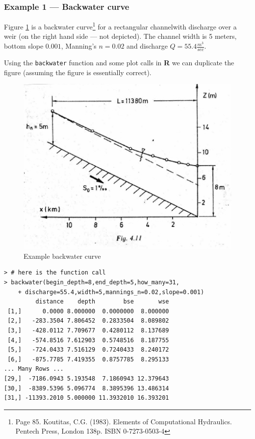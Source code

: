 \subsubsection{Example 1 --- Backwater curve}

Figure \ref{fig:example1} is a backwater curve\footnote{Page 85.  
   Koutitas, C.G. (1983). Elements of Computational Hydraulics. Pentech Press, London 138p. ISBN 0-7273-0503-4 } for a rectangular channelwith discharge over a weir (on the right hand side --- not depicted).  The channel width is 5 meters, bottom slope $0.001$, Manning's $n=0.02$ and discharge $Q=55.4 \frac{m^3}{sec}$.

Using the \texttt{backwater} function and some plot calls in \textbf{R} we can duplicate the figure (assuming the figure is essentially correct).

\begin{figure}[h!] %
   \centering
   \includegraphics[width=5in]{bw_curve1.jpg} 
   \caption{Example backwater curve} 
   \label{fig:example1}
\end{figure}
\newpage
\begin{lstlisting}[caption=R Console Output when script is run \\ , label=lst:backwaterConsole]
> # here is the function call
> backwater(begin_depth=8,end_depth=5,how_many=31,
    + discharge=55.4,width=5,mannings_n=0.02,slope=0.001)
         distance    depth        bse       wse
 [1,]      0.0000 8.000000  0.0000000  8.000000
 [2,]   -283.3504 7.806452  0.2833504  8.089802
 [3,]   -428.0112 7.709677  0.4280112  8.137689
 [4,]   -574.8516 7.612903  0.5748516  8.187755
 [5,]   -724.0433 7.516129  0.7240433  8.240172
 [6,]   -875.7785 7.419355  0.8757785  8.295133
... Many Rows ...
[29,]  -7186.0943 5.193548  7.1860943 12.379643
[30,]  -8389.5396 5.096774  8.3895396 13.486314
[31,] -11393.2010 5.000000 11.3932010 16.393201
\end{lstlisting} 

